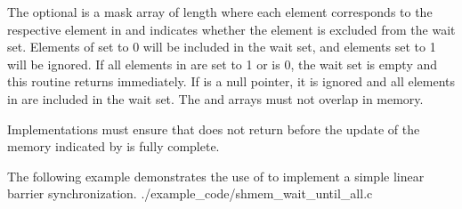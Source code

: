 \begin{apidefinition}
{    The optional  is a mask array of length  where each
    element corresponds to the respective element in  and indicates
    whether the element is excluded from the wait set.  Elements of
     set to 0 will be included in the wait set, and elements set to
    1 will be ignored.  If all elements in  are set to 1 or
     is 0, the wait set is empty and this routine returns
    immediately.  If  is a null pointer, it is ignored and
    all elements in  are included in the wait set.  The 
    and  arrays must not overlap in memory.

    Implementations must ensure that  does not
    return before the update of the memory indicated by  is fully
    complete.
}




\begin{apiexamples}
  \apicexample
      {The following \Cstd[11] example demonstrates the use of
       to implement a simple linear barrier
      synchronization.}
      {./example_code/shmem_wait_until_all.c}
      {}

\end{apiexamples}

\end{apidefinition}
